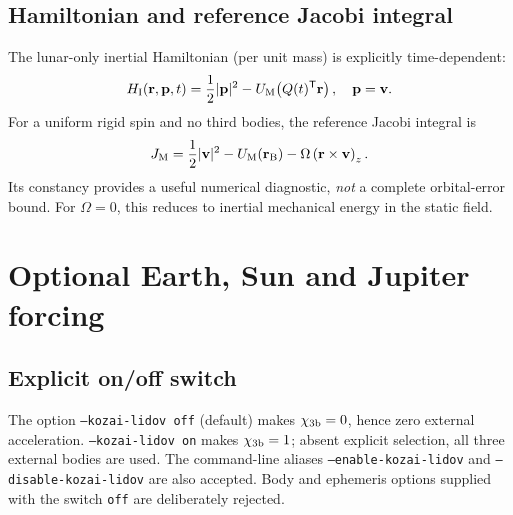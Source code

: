 \documentclass[11pt,a4paper]{article}
\newcommand{\opt}[1]{\texttt{#1}}
\begin{document}
\subsection{Hamiltonian and reference Jacobi integral}
The lunar-only inertial Hamiltonian (per unit mass) is explicitly time-dependent:
\begin{equation}
H_{\rm I}(\mathbf r,\mathbf p,t)={1\over2}|\mathbf p|^2-
U_{\rm M}\!\left(Q(t)^{\mathsf T}\mathbf r\right),\quad \mathbf p=\mathbf v.
\end{equation}
For a uniform rigid spin and no third bodies, the reference Jacobi integral is
\begin{equation}
J_{\rm M}={1\over2}|\mathbf v|^2-U_{\rm M}(\mathbf r_{\rm B})-
\Omega\left(\mathbf r\times\mathbf v\right)_z.
\label{eq:jacobi}
\end{equation}
Its constancy provides a useful numerical diagnostic, \emph{not} a complete orbital-error bound. For \(\Omega=0\), this reduces to inertial mechanical energy in the static field.

\section{Optional Earth, Sun and Jupiter forcing}
\label{sec:thirdbodies}
\subsection{Explicit on/off switch}
The option \opt{--kozai-lidov off} (default) makes \(\chi_{\rm 3b}=0\), hence zero external acceleration. \opt{--kozai-lidov on} makes \(\chi_{\rm 3b}=1\); absent explicit selection, all three external bodies are used. The command-line aliases \opt{--enable-kozai-lidov} and \opt{--disable-kozai-lidov} are also accepted. Body and ephemeris options supplied with the switch \opt{off} are deliberately rejected.
\end{document}

